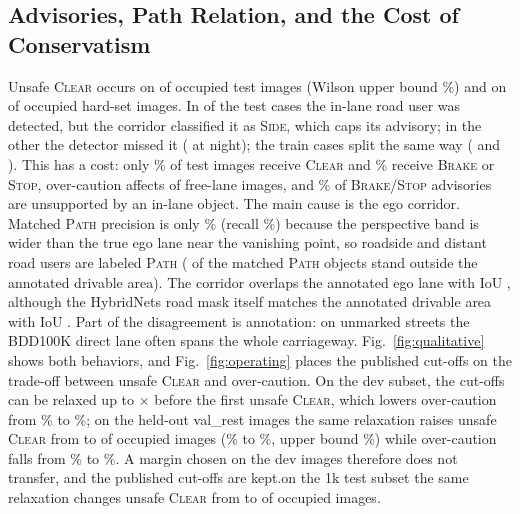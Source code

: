 \documentclass[conference,a4paper]{IEEEtran}
\newif\ifextended
\newcommand{\st}[1]{\textsc{#1}}
\begin{document}
\subsection{Advisories, Path Relation, and the Cost of Conservatism}
Unsafe \st{Clear} occurs on \TestUnsafe{} of \TestOccupied{} occupied test images (Wilson upper bound \TestUnsafeHigh\%) and on \HardUnsafe{} of \HardOccupied{} occupied hard-set images.\ifdefined\TestUnsafeDetected{} In \TestUnsafeDetected{} of the \TestUnsafe{} test cases the in-lane road user was detected, but the corridor classified it as \st{Side}, which caps its advisory; in the other \TestUnsafeMissed{} the detector missed it (\TestUnsafeMissedNight{} at night)\ifdefined\TrainUnsafeDetected{}; the \TrainUnsafe{} train cases split the same way (\TrainUnsafeDetected{} and \TrainUnsafeMissed{})\fi.\fi{} This has a cost: only \TestClearPct\% of test images receive \st{Clear} and \TestSeverePct\% receive \st{Brake} or \st{Stop}, over-caution affects \TestOver{} of \TestFree{} free-lane images, and \TestUnsupportedPct\% of \st{Brake}/\st{Stop} advisories are unsupported by an in-lane object. The main cause is the ego corridor. Matched \st{Path} precision is only \TestPathPrec\% (recall \TestPathRec\%) because the perspective band is wider than the true ego lane near the vanishing point, so roadside and distant road users are labeled \st{Path} (\TestPathOff{} of the \TestPathPrecN{} matched \st{Path} objects stand outside the annotated drivable area). The corridor overlaps the annotated ego lane with IoU \TestCorridorIoU, although the HybridNets road mask itself matches the annotated drivable area with IoU \TestRoadIoU. Part of the disagreement is annotation: on unmarked streets the BDD100K direct lane often spans the whole carriageway. Fig.~\ref{fig:qualitative} shows both behaviors, and Fig.~\ref{fig:operating} places the published cut-offs on the trade-off between unsafe \st{Clear} and over-caution. On the dev subset, the cut-offs can be relaxed up to $\times$\OpDevSafeScale{} before the first unsafe \st{Clear}, which lowers over-caution from \OpDevBaseOverPct\% to \OpDevSafeOverPct\%\ifextended{} (at $\times$\OpDevMaxScale{} it falls to \OpDevMaxOverPct\% while \OpDevMaxUnsafePct\% of occupied images receive \st{Clear})\fi; \ifdefined\OpValopChosenUnsafe on the \OpValopImages{} held-out val\_rest images the same relaxation raises unsafe \st{Clear} from \OpValopBaseUnsafe{} to \OpValopChosenUnsafe{} of \OpValopOccupied{} occupied images (\OpValopBaseUnsafePct\% to \OpValopChosenUnsafePct\%, upper bound \OpValopChosenUnsafeHigh\%) while over-caution falls from \OpValopBaseOverPct\% to \OpValopChosenOverPct\%\ifextended\ifdefined\OpTrainChosenUnsafe{}, and on the \OpTrainImages{} train images unsafe \st{Clear} moves from \OpTrainBaseUnsafePct\% to \OpTrainChosenUnsafePct\% and over-caution from \OpTrainBaseOverPct\% to \OpTrainChosenOverPct\%\fi\fi. A margin chosen on the \DevImages{} dev images therefore does not transfer, and the published cut-offs are kept.\else on the 1k test subset the same relaxation changes unsafe \st{Clear} from \OpStdBaseUnsafe{} to \OpStdAtSafeUnsafe{} of \OpStdOccupied{} occupied images.\fi
\end{document}
